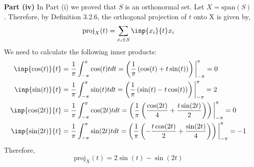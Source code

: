 \documentclass[letterpaper,12pt]{article}
\theoremstyle{definition}
\begin{document}
\noindent\textbf{Part (iv)}
In Part (i) we proved that $S$ is an orthonormal set. Let $X = \text{span}(S)$. Therefore, by Definition 3.2.6, the orthogonal projection of $t$ onto X is given by,
\begin{equation}
	\text{proj}_X(t) = \sum_{x_i \in S} \inp{x_i}{t} x_i
\end{equation}
We need to calculate the following inner products:
\begin{align*}
	\inp{\cos(t)}{t} &=  \frac{1}{\pi} \int_{-\pi}^{\pi} \cos(t) t dt = \left(\frac{1}{\pi}\left(\cos(t) +t\sin(t) \right) \right) \bigg\rvert_{-\pi}^{\pi} = 0  \\
	\inp{\sin(t)}{t} &=  \frac{1}{\pi} \int_{-\pi}^{\pi} \sin(t) t dt = \left(\frac{1}{\pi}\left(\sin(t) - t\cos(t) \right) \right) \bigg\rvert_{-\pi}^{\pi} = 2  \\
	\inp{\cos(2t)}{t} &=  \frac{1}{\pi} \int_{-\pi}^{\pi} \cos(2t) t dt = \left(\frac{1}{\pi}\left(\frac{\cos(2t)}{4}+ \frac{t\sin(2t)}{2}\right) \right) \bigg\rvert_{-\pi}^{\pi} = 0  \\
	\inp{\sin(2t)}{t} &=  \frac{1}{\pi} \int_{-\pi}^{\pi} \sin(2t) t dt = \left(\frac{1}{\pi}\left(-\frac{t\cos(2t)}{2}+ \frac{\sin(2t)}{4}\right) \right) \bigg\rvert_{-\pi}^{\pi} = -1  \\
\end{align*}
Therefore,
\begin{equation}
	\text{proj}_X(t) = 2\sin(t) - \sin(2t)
\end{equation}
\end{document}
